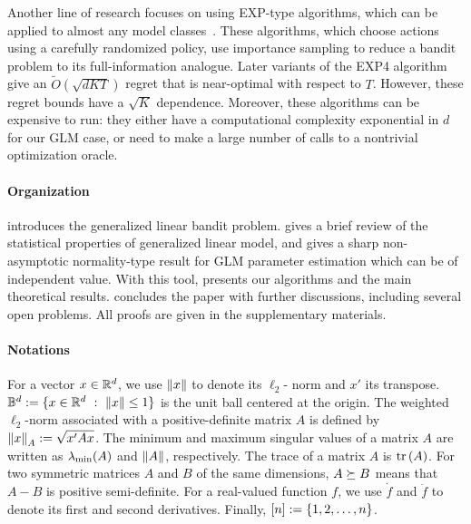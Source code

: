 Another line of research focuses on using EXP-type algorithms, which can be applied to almost any model classes~\cite{auer2002nonstochastic}. These algorithms, which choose actions using a carefully randomized policy, use importance sampling to reduce a bandit problem to its full-information analogue.
Later variants of the EXP4 algorithm~\cite{beygelzimer2010contextual,agarwal2014taming} give an $\tilde{O}(\sqrt{dKT})$ regret that is near-optimal with respect to $T$. However, these regret bounds have a $\sqrt{K}$ dependence. Moreover, these algorithms can be expensive to run: they either have a computational complexity exponential in $d$ for our GLM case, or need to make a large number of calls to a nontrivial optimization oracle.

\paragraph{Organization} 
  introduces the generalized linear bandit problem.   gives a brief review of the statistical properties of generalized linear model, and gives a sharp non-asymptotic normality-type result for GLM parameter estimation which can be of independent value.  With this tool,  presents our algorithms and the main theoretical results.   concludes the paper with further discussions, including several open problems.
All proofs are given in the supplementary materials.


\paragraph{Notations} 
For a vector $x \in \mathbb{R}^{d}$, we use $\left\|x\right\|$ to denote its $\ell_2$- norm and $x'$ its transpose. 
$\mathbb{B}^d:=\{x\in\mathbb{R}^d ~:~ \left\|x\right\|\le1\}$ is the unit ball centered at the origin.  The weighted $\ell_2$-norm associated with a positive-definite matrix $A$ is defined by $\left\|x\right\|_A := \sqrt{x' Ax}$. The minimum and maximum singular values of a matrix $A$ are written as $\lambda_{\min}(A)$ and $\left\|A\right\|$, respectively.  The trace of a matrix $A$ is $\textrm{tr}\left(A\right)$.  For two symmetric matrices $A$ and $B$ of the same dimensions, $A \succeq B$ means that $A-B$ is positive semi-definite.   For a real-valued function $f$, we use $\dot{f}$ and $\ddot{f}$ to denote its first and second derivatives.  Finally, $[n] := \{1,2,\ldots,n\}$.

